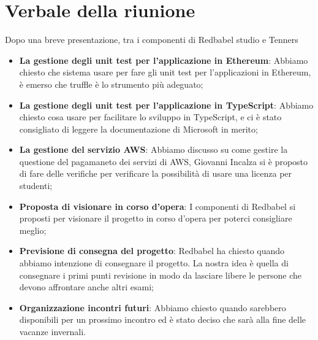 \section{Verbale della riunione}
		Dopo una breve presentazione, tra i componenti di Redbabel studio e Tenners
	\begin{itemize}
		\item \textbf {La gestione degli unit test per l'applicazione in Ethereum}: Abbiamo chiesto che sistema usare per fare gli unit test per l'applicazioni in Ethereum, è emerso che truffle è lo strumento più adeguato;
		\item \textbf {La gestione degli unit test per l'applicazione in TypeScript}: Abbiamo chiesto cosa usare per facilitare lo sviluppo in TypeScript, e ci è stato consigliato di leggere la documentazione di Microsoft in merito;
		\item \textbf {La gestione del servizio AWS}: Abbiamo discusso su come gestire la questione del pagamaneto dei servizi di AWS, Giovanni Incalza si è proposto di fare delle verifiche per verificare la possibilità di usare una licenza per studenti;
		\item \textbf {Proposta di visionare in corso d'opera}: I componenti di Redbabel si proposti per visionare il progetto in corso d'opera per poterci consigliare meglio;
		\item \textbf {Previsione di consegna del progetto}: Redbabel ha chiesto quando abbiamo intenzione di consegnare il progetto. La nostra idea è quella di consegnare i primi punti revisione in modo da lasciare libere le persone che devono affrontare anche altri esami;
		\item \textbf {Organizzazione incontri futuri}: Abbiamo chiesto quando sarebbero disponibili per un prossimo incontro ed è stato deciso che sarà alla fine delle vacanze invernali.
	\end{itemize}
